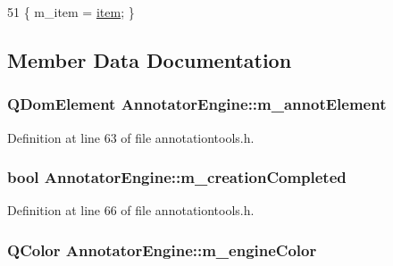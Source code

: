 \begin{DoxyCode}
51 \{ m\_item = \hyperlink{classAnnotatorEngine_a67d46d5364e6f54e107ccbbb1ed07e32}{item}; \}
\end{DoxyCode}


\subsection{Member Data Documentation}
\hypertarget{classAnnotatorEngine_ac95af6291cc2f0c601e1bbf8a5e6a0bd}{
\subsubsection[{m\+\_\+annot\+Element}]{\setlength{\rightskip}{0pt plus 5cm}Q\+Dom\+Element Annotator\+Engine\+::m\+\_\+annot\+Element\hspace{0.3cm}{\ttfamily [protected]}}}\label{classAnnotatorEngine_ac95af6291cc2f0c601e1bbf8a5e6a0bd}


Definition at line 63 of file annotationtools.\+h.

\hypertarget{classAnnotatorEngine_a0df119b4d87a1e3ea8ed60a96d7ff444}{
\subsubsection[{m\+\_\+creation\+Completed}]{\setlength{\rightskip}{0pt plus 5cm}bool Annotator\+Engine\+::m\+\_\+creation\+Completed\hspace{0.3cm}{\ttfamily [protected]}}}\label{classAnnotatorEngine_a0df119b4d87a1e3ea8ed60a96d7ff444}


Definition at line 66 of file annotationtools.\+h.

\hypertarget{classAnnotatorEngine_a8911b0455be7eedfb2c102ce19acdce2}{
\subsubsection[{m\+\_\+engine\+Color}]{\setlength{\rightskip}{0pt plus 5cm}Q\+Color Annotator\+Engine\+::m\+\_\+engine\+Color\hspace{0.3cm}{\ttfamily [protected]}}}\label{classAnnotatorEngine_a8911b0455be7eedfb2c102ce19acdce2}


